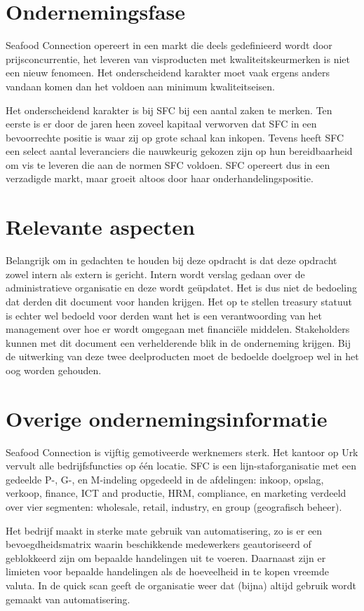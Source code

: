 \documentclass[10pt,a4paper,twoside]{report}
\begin{document}
\section{Ondernemingsfase}
Seafood Connection opereert in een markt die deels gedefinieerd wordt door prijsconcurrentie, het leveren van visproducten met kwaliteitskeurmerken is niet een nieuw fenomeen. Het onderscheidend karakter moet vaak ergens anders vandaan komen dan het voldoen aan minimum kwaliteitseisen. 

Het onderscheidend karakter is bij SFC bij een aantal zaken te merken. Ten eerste is er door de jaren heen zoveel kapitaal verworven dat SFC in een bevoorrechte positie is waar zij op grote schaal kan inkopen. Tevens heeft SFC een select aantal leveranciers die nauwkeurig gekozen zijn op hun bereidbaarheid om vis te leveren die aan de normen SFC voldoen. SFC opereert dus in een verzadigde markt, maar groeit altoos door haar onderhandelingspositie.

\section{Relevante aspecten}
Belangrijk om in gedachten te houden bij deze opdracht is dat deze opdracht zowel intern als extern is gericht. Intern wordt verslag gedaan over de administratieve organisatie en deze wordt geüpdatet. Het is dus niet de bedoeling dat derden dit document voor handen krijgen. Het op te stellen treasury statuut is echter wel bedoeld voor derden want het is een verantwoording van het management over hoe er wordt omgegaan met financiële middelen. Stakeholders kunnen met dit document een verhelderende blik in de onderneming krijgen. Bij de uitwerking van deze twee deelproducten moet de bedoelde doelgroep wel in het oog worden gehouden.

\section{Overige ondernemingsinformatie}
Seafood Connection is vijftig gemotiveerde werknemers sterk. Het kantoor op Urk vervult alle bedrijfsfuncties op één locatie. SFC is een lijn-staforganisatie met een gedeelde P-, G-, en M-indeling opgedeeld in de afdelingen: inkoop, opslag, verkoop, finance, ICT and productie, HRM, compliance, en marketing verdeeld over vier segmenten: wholesale, retail, industry, en group (geografisch beheer). \citep{quickscan}

Het bedrijf maakt in sterke mate gebruik van automatisering, zo is er een bevoegdheidsmatrix waarin beschikkende medewerkers geautoriseerd of geblokkeerd zijn om bepaalde handelingen uit te voeren. Daarnaast zijn er limieten voor bepaalde handelingen als de hoeveelheid in te kopen vreemde valuta. In de quick scan geeft de organisatie weer dat (bijna) altijd gebruik wordt gemaakt van automatisering. \citep{quickscan}
\end{document}

